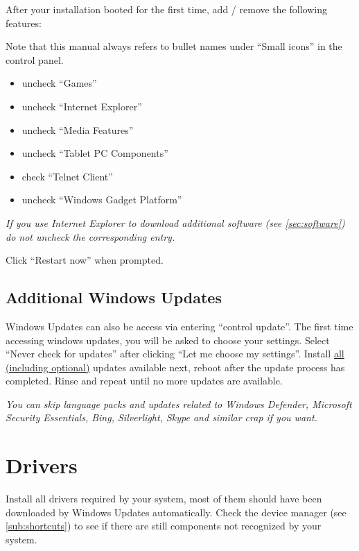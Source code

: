 \documentclass{itsarticle}
\begin{document}
After your installation booted for the first time, add / remove the following
features:


Note that this manual always refers to bullet names under ``Small icons'' in
the control panel.

\begin{itemize}
    \item uncheck ``Games''
    \item uncheck ``Internet Explorer''
    \item uncheck ``Media Features''
    \item uncheck ``Tablet PC Components''
    \item check ``Telnet Client''
    \item uncheck ``Windows Gadget Platform''
\end{itemize}

\textit{If you use Internet Explorer to download additional software (see
\cref{sec:software}) do not uncheck the corresponding entry.}

Click ``Restart now'' when prompted.

\subsection{Additional Windows Updates}
\label{sub:updates_post_install}

Windows Updates can also be access via  entering ``control
update''. The first time accessing windows updates, you will be asked to choose
your settings. Select ``Never check for updates'' after clicking ``Let me
choose my settings''. Install \underline{all (including optional)} updates
available next, reboot after the update process has completed. Rinse and repeat
until no more updates are available.

\textit{You can skip language packs and updates related to Windows Defender,
Microsoft Security Essentials, Bing, Silverlight, Skype and similar crap if you
want.}

\section{Drivers}
\label{sec:drivers}

Install all drivers required by your system, most of them should have been
downloaded by Windows Updates automatically. Check the device manager (see
\cref{sub:shortcuts}) to see if there are still components not recognized by
your system.
\end{document}
